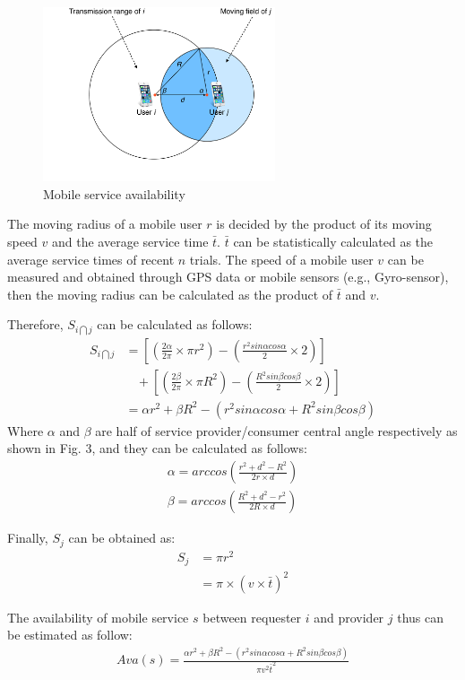 \documentclass[journal]{IEEEtran}
\begin{document}
\begin{figure}[!t]
\centering
\includegraphics[width=2.7in]{./img/pic3.pdf}
\caption{Mobile service availability}
\label{fig_sd}
\end{figure}

The moving radius of a mobile user $r$ is decided by the product of its moving speed $v$ and the average service time $\bar{t}$. $\bar{t}$ can be statistically calculated as the average service times of recent $n$ trials.
The speed of a mobile user $v$ can be measured and obtained through GPS data or mobile sensors (e.g., Gyro-sensor), then the moving radius can be calculated as the product of $\bar{t}$ and $v$.

Therefore, $S_{i \bigcap j}$ can be calculated as follows:
\setlength{\arraycolsep}{0.0em}
\begin{align}
S_{i \bigcap j} & =  [(\frac{2\alpha}{2\pi} \times \pi r^2)-(\frac{r^2 sin\alpha cos\alpha}{2} \times 2)]\\\nonumber
& \ \ \ \ +[(\frac{2\beta}{2\pi} \times \pi R^2)-(\frac{R^2 sin\beta cos\beta}{2} \times 2)]\\\nonumber
& = \alpha r^2 + \beta R^2 - (r^2 sin\alpha cos\alpha + R^2 sin\beta cos\beta)
\end{align}
\setlength{\arraycolsep}{5pt}
Where $\alpha$ and $\beta$ are half of service provider/consumer central angle respectively as shown in Fig. 3, and they can be calculated as follows:
\begin{eqnarray}
\alpha = arccos(\frac{r^2+d^2-R^2}{2r\times d}) \\\nonumber
\beta = arccos(\frac{R^2+d^2-r^2}{2R\times d})
\end{eqnarray}

Finally, $S_j$ can be obtained as:
\begin{align}
S_j & = \pi r^2 \\\nonumber
& = \pi \times (v \times \bar{t})^2
\end{align}

The availability of mobile service $s$ between requester $i$ and provider $j$ thus can be estimated as follow:
\begin{align}
Ava(s) = \frac{\alpha r^2 + \beta R^2 - (r^2 sin\alpha cos\alpha + R^2 sin\beta cos\beta)}{\pi v^2 \bar{t}^2}
\end{align}
\end{document}
